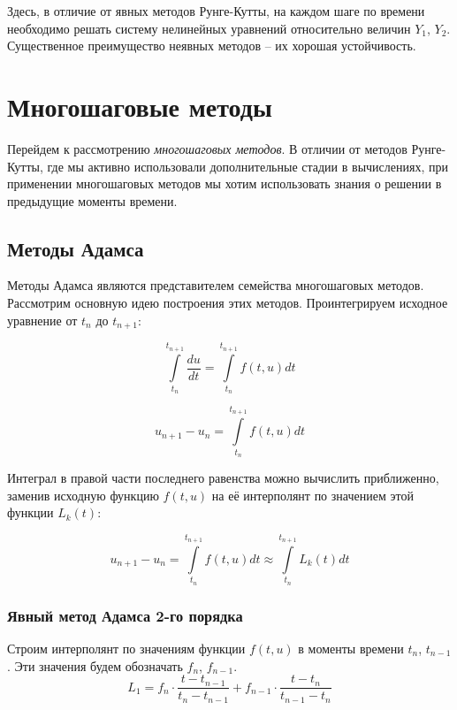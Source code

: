\documentclass[10pt,a4paper]{article}
\begin{document}
Здесь, в отличие от явных методов Рунге-Кутты, на каждом шаге по времени 
необходимо решать систему нелинейных уравнений относительно величин $Y_1$, 
$Y_2$. Существенное преимущество неявных методов -- их хорошая устойчивость.

\section{Многошаговые методы}

Перейдем к рассмотрению \textit{многошаговых методов}. В отличии от методов 
Рунге-Кутты, где мы активно использовали дополнительные стадии в вычислениях,
при применении многошаговых методов мы хотим использовать знания о решении
в предыдущие моменты времени.

\subsection{Методы Адамса}

	Методы Адамса являются представителем семейства многошаговых методов. 
	Рассмотрим основную идею построения этих методов. Проинтегрируем исходное 
	уравнение от $t_n$ до $t_{n+1}$:
	
	\begin{equation}
		\int\limits_{t_{n}}^{t_{n + 1}}\frac{du}{dt} = \int\limits_{t_{n}}
		^{t_{n + 1}}f\left(t, u\right)dt
	\end{equation}
	
	\begin{equation}
	u_{n + 1} - u_{n} = \int\limits_{t_{n}}^{t_{n + 1}}f\left(t, u\right)dt 
	\end{equation}
	
	Интеграл в правой части последнего равенства можно вычислить приближенно, 
	заменив исходную функцию $f(t,u)$ на её интерполянт по значением этой 
	функции $L_k(t)$:
	
	\begin{equation}
		u_{n + 1} - u_{n} = \int\limits_{t_{n}}^{t_{n + 1}}f\left(t, u\right)dt 
		\approx \int\limits_{t_{n}}^{t_{n + 1}}L_{k}\left(t\right) dt
	\end{equation}
	
	\subsubsection{Явный метод Адамса 2-го порядка}
	
		Строим интерполянт по значениям функции $f(t,u)$ в моменты времени $t_n
		$, $t_{n-1}$. Эти значения будем обозначать $f_n$, $f_{n-1}$.
		\begin{equation}
			L_{1} = f_{n}\cdot\frac{t - t_{n - 1}}{t_{n} - t_{n - 1}} + 
			f_{n - 1}\cdot\frac{t - t_{n}}{t_{n - 1} - t_{n}}
		\end{equation}
		
\end{document}
